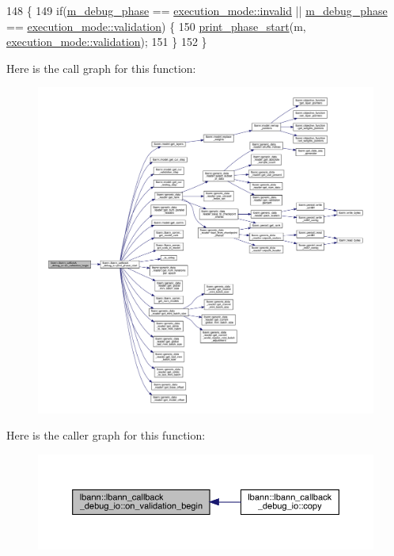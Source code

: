 \begin{DoxyCode}
148                                                                \{
149   \textcolor{keywordflow}{if}(\hyperlink{classlbann_1_1lbann__callback__debug__io_add73fbc786ca9284fa3399a7e99d0b1f}{m\_debug\_phase} == \hyperlink{base_8hpp_a2781a159088df64ed7d47cc91c4dc0a8afedb2d84cafe20862cb4399751a8a7e3}{execution\_mode::invalid} || 
      \hyperlink{classlbann_1_1lbann__callback__debug__io_add73fbc786ca9284fa3399a7e99d0b1f}{m\_debug\_phase} == \hyperlink{base_8hpp_a2781a159088df64ed7d47cc91c4dc0a8aa617908b172c473cb8e8cda059e55bf0}{execution\_mode::validation}) \{
150     \hyperlink{classlbann_1_1lbann__callback__debug__io_a528f4aea5f657f40b27c58a164d4095a}{print\_phase\_start}(m, \hyperlink{base_8hpp_a2781a159088df64ed7d47cc91c4dc0a8aa617908b172c473cb8e8cda059e55bf0}{execution\_mode::validation});
151   \}
152 \}
\end{DoxyCode}
Here is the call graph for this function\+:\nopagebreak
\begin{figure}[H]
\begin{center}
\leavevmode
\includegraphics[width=350pt]{classlbann_1_1lbann__callback__debug__io_ac26d9c113c1345cc1d6390141e1a894b_cgraph}
\end{center}
\end{figure}
Here is the caller graph for this function\+:\nopagebreak
\begin{figure}[H]
\begin{center}
\leavevmode
\includegraphics[width=350pt]{classlbann_1_1lbann__callback__debug__io_ac26d9c113c1345cc1d6390141e1a894b_icgraph}
\end{center}
\end{figure}

